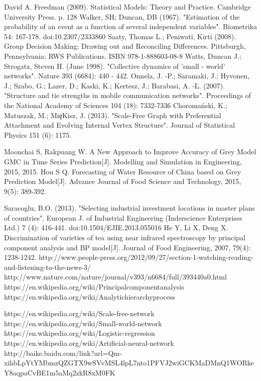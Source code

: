 \begin{thebibliography}{99}
	
David A. Freedman (2009). Statistical Models: Theory and Practice. Cambridge University Press. p. 128
Walker, SH; Duncan, DB (1967). "Estimation of the probability of an event as a function of several independent variables". Biometrika 54: 167-178. doi:10.2307/2333860
 Saaty, Thomas L.; Peniwati, Kirti (2008). Group Decision Making: Drawing out and Reconciling Differences. Pittsburgh, Pennsylvania: RWS Publications. ISBN 978-1-888603-08-8
Watts, Duncan J.; Strogatz, Steven H. (June 1998). "Collective dynamics of 'small - world' networks". Nature 393 (6684): 440 - 442. 
Onnela, J. -P.; Saramaki, J.; Hyvonen, J.; Szabo, G.; Lazer, D.; Kaski, K.; Kertesz, J.; Barabasi, A. -L. (2007). "Structure and tie strengths in mobile communication networks". Proceedings of the National Academy of Sciences 104 (18): 7332-7336
Choromański, K.; Matuszak, M.; MiȩKisz, J. (2013). "Scale-Free Graph with Preferential Attachment and Evolving Internal Vertex Structure". Journal of Statistical Physics 151 (6): 1175.

Moonchai S, Rakpuang W. A New Approach to Improve Accuracy of Grey Model GMC in Time Series Prediction[J]. Modelling and Simulation in Engineering, 2015, 2015.
Hou S Q. Forecasting of Water Resource of China based on Grey Prediction Model[J]. Advance Journal of Food Science and Technology, 2015, 9(5): 389-392.

Saracoglu, B.O. (2013). "Selecting industrial investment locations in master plans of countries". European J. of Industrial Engineering (Inderscience Enterprises Ltd.) 7 (4): 416-441. doi:10.1504/EJIE.2013.055016
He Y, Li X, Deng X. Discrimination of varieties of tea using near infrared spectroscopy by principal component analysis and BP model[J]. Journal of Food Engineering, 2007, 79(4): 1238-1242.
http://www.people-press.org/2012/09/27/section-1-watching-reading-and-listening-to-the-news-3/
http://www.nature.com/nature/journal/v393/n6684/full/393440a0.html
https://en.wikipedia.org/wiki/Principalcomponentanalysis
https://en.wikipedia.org/wiki/Analytichierarchyprocess 

https://en.wikipedia.org/wiki/Scale-free-network
https://en.wikipedia.org/wiki/Small-world-network
https://en.wikipedia.org/wiki/Logistic-regression
https://en.wikipedia.org/wiki/Artificial-neural-network
http://baike.baidu.com/link?url=Qm-xihbLpYtYMbmzQZGTX9wSVvMSL4lpL7nto1PFVJ2wiGCKMaDMnQ1WORkeY8aqpaCvBE1m5aMq2zkR8xM0FK
\end{thebibliography}

